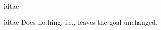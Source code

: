 \begin{tactic}{idtac}
  \begin{tsyntax}[empty]{idtac}
    Does nothing, i.e., leaves the goal unchanged.
  \end{tsyntax}
\end{tactic}
